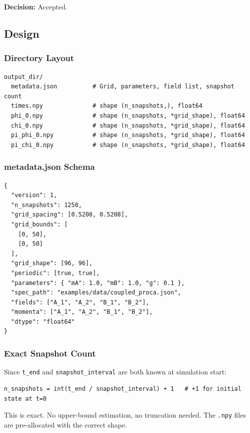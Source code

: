 \textbf{Decision:} Accepted.


\subsection{Design}
\label{sec:adr-design}

\subsubsection{Directory Layout}

\begin{lstlisting}[style=bash]
output_dir/
  metadata.json          # Grid, parameters, field list, snapshot count
  times.npy              # shape (n_snapshots,), float64
  phi_0.npy              # shape (n_snapshots, *grid_shape), float64
  chi_0.npy              # shape (n_snapshots, *grid_shape), float64
  pi_phi_0.npy           # shape (n_snapshots, *grid_shape), float64
  pi_chi_0.npy           # shape (n_snapshots, *grid_shape), float64
\end{lstlisting}

\subsubsection{metadata.json Schema}

\begin{lstlisting}[style=json]
{
  "version": 1,
  "n_snapshots": 1250,
  "grid_spacing": [0.5208, 0.5208],
  "grid_bounds": [
    [0, 50],
    [0, 50]
  ],
  "grid_shape": [96, 96],
  "periodic": [true, true],
  "parameters": { "mA": 1.0, "mB": 1.0, "g": 0.1 },
  "spec_path": "examples/data/coupled_proca.json",
  "fields": ["A_1", "A_2", "B_1", "B_2"],
  "momenta": ["A_1", "A_2", "B_1", "B_2"],
  "dtype": "float64"
}
\end{lstlisting}

\subsubsection{Exact Snapshot Count}

Since \texttt{t\_end} and \texttt{snapshot\_interval} are both known at simulation start:

\begin{lstlisting}[style=python]
n_snapshots = int(t_end / snapshot_interval) + 1   # +1 for initial state at t=0
\end{lstlisting}

This is exact. No upper-bound estimation, no truncation needed. The \texttt{.npy} files are pre-allocated with the correct shape.

